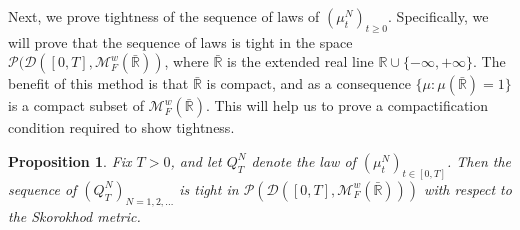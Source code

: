 \documentclass{article}
\newtheorem{propn}[theorem]{Proposition}
\newcommand{\B}[1]{\mathbb{#1}}
\newcommand{\C}[1]{\mathcal{#1}}
\begin{document}
\vspace{1em}

Next, we prove tightness of the sequence of laws of $(\mu_t^N)_{t\geq 0}$. Specifically, we will prove that the sequence of laws is tight in the space $\C{P}(\C{D}([0,T],\C{M}^w_F(\bar{\B{R}}))$, where $\bar{\B{R}}$ is the extended real line $\B{R}\cup\{-\infty,+\infty\}$. The benefit of this method is that $\bar{\B{R}}$ is compact, and as a consequence $\{\mu:\mu(\bar{\B{R}})=1\}$ is a compact subset of $\C{M}^w_F(\bar{\B{R}})$. This will help us to prove a compactification condition required to show tightness. 

\vspace{1em}

\begin{propn} \label{tightness}
    Fix $T>0$, and let $Q^N_T$ denote the law of $(\mu_t^N)_{t\in [0,T]}$. Then the sequence of $(Q^N_T)_{N=1,2,\ldots}$ is tight in $\C{P}(\C{D}([0,T],\C{M}_F^w(\bar{\B{R}})))$ with respect to the Skorokhod metric.
\end{propn}
\end{document}
